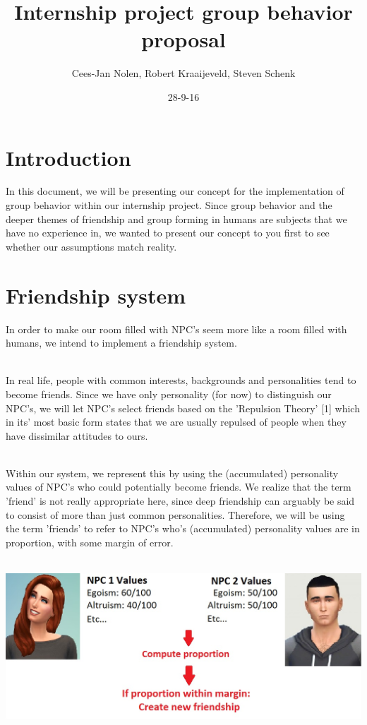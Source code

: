 \documentclass[11pt]{article} %
\title{Internship project group behavior proposal}
\author{Cees-Jan Nolen, Robert Kraaijeveld, Steven Schenk}
\date{28-9-16}
\begin{document}
  \maketitle
  \newpage
  \tableofcontents

\newpage
\section{Introduction}
In this document, we will be presenting our concept for the implementation of group behavior within our internship project. Since group behavior and the deeper themes of friendship and group forming in humans are subjects that we have no experience in, we wanted to present our concept to you first to see whether our assumptions match reality. 

\section{Friendship system}
In order to make our room filled with NPC's seem more like a room filled with humans, we intend to implement a friendship system. 

~\\
In real life, people with common interests, backgrounds and personalities tend to become friends. Since we have only personality (for now) to distinguish our NPC's, we will let NPC's select friends based on the 'Repulsion Theory' [1] which in its' most basic form states that we are usually repulsed of people when they have dissimilar attitudes to ours.

~\\
Within our system, we represent this by using the (accumulated) personality values of NPC's who could potentially become friends. We realize that the term 'friend' is not really appropriate here, since deep friendship can arguably be said to consist of more than just common personalities. Therefore, we will be using the term 'friends' to refer to NPC's who's (accumulated) personality values are in proportion, with some margin of error.

~\\
\includegraphics[scale=0.5]{friendshipCreation}
\end{document}
